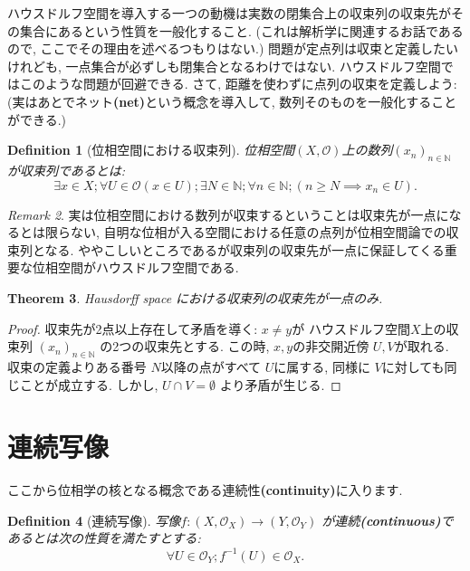 \documentclass[lualatex]{ltjsbook}
\newtheorem{theorem}{Theorem}[chapter]
\newtheorem{definition}[theorem]{Definition}
\theoremstyle{remark}
\newtheorem{remark}[theorem]{Remark}
\theoremstyle{plain}
\begin{document}
ハウスドルフ空間を導入する一つの動機は実数の閉集合上の収束列の収束先がその集合にあるという性質を一般化すること. 
(これは解析学に関連するお話であるので,  ここでその理由を述べるつもりはない.)
問題が定点列は収束と定義したいけれども,  一点集合が必ずしも閉集合となるわけではない.
ハウスドルフ空間ではこのような問題が回避できる.
さて,  距離を使わずに点列の収束を定義しよう:(実はあとでネット\textbf{(net)}という概念を導入して, 数列そのものを一般化することができる.)

 \begin{definition}[位相空間における収束列]
	位相空間$\left( X , \mathcal{O} \right) $上の数列$\left( x_n \right) _{n \in \mathbb{N}}$が収束列であるとは:
	\[
	\exists x \in X ; \forall U \in \mathcal{O}\left( x \in U \right) ; \exists N \in \mathbb{N}; \forall n \in \mathbb{N}; \left( n \ge N \implies x_n \in U \right) 
	.\] 
\end{definition}

\begin{remark}
実は位相空間における数列が収束するということは収束先が一点になるとは限らない,  自明な位相が入る空間における任意の点列が位相空間論での収束列となる. 
ややこしいところであるが収束列の収束先が一点に保証してくる重要な位相空間がハウスドルフ空間である.	
\end{remark}

\begin{theorem}
Hausdorff space における収束列の収束先が一点のみ.
\end{theorem}

\begin{proof}
	収束先が2点以上存在して矛盾を導く: $x \neq y$が ハウスドルフ空間$X$上の収束列 $\left( x_n \right) _{n \in \mathbb{N} }$ の2つの収束先とする. 
	この時, $x, y$の非交開近傍 $U, V$が取れる. 
	収束の定義よりある番号 $N$以降の点がすべて $U$に属する,  同様に $V$に対しても同じことが成立する. 
	しかし,   $U\cap V = \emptyset$ より矛盾が生じる.
\end{proof}

\section{連続写像}%
\label{sec:連続写像}
ここから位相学の核となる概念である連続性\textbf{(continuity)}に入ります.
\begin{definition}[連続写像]
	写像$f: \left( X ,  \mathcal{O}_X \right) \to \left( Y,  \mathcal{O}_Y \right) $ が連続\textbf{(continuous)}であるとは次の性質を満たすとする:
	\[
	\forall U \in \mathcal{O}_Y; f^{-1}\left( U \right) \in \mathcal{O}_X 
	.\] 
\end{definition}
\end{document}
